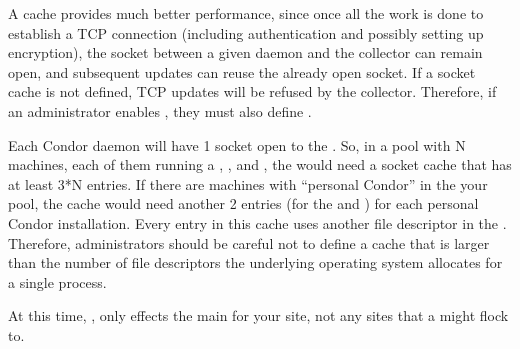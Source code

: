 A cache provides much better performance, since once all the work is
done to establish a TCP connection (including authentication and
possibly setting up encryption), the socket between a given daemon and
the collector can remain open, and subsequent updates can reuse the
already open socket.
If a socket cache is not defined, TCP updates will be refused by
the collector.
Therefore, if an administrator enables
, they must also define
.

Each Condor daemon will have 1 socket open to the .
So, in a pool with N machines, each of them running a ,
, and , the  would
need a socket cache that has at least 3*N entries.
If there are machines with ``personal Condor'' in the your pool, the
cache would need another 2 entries (for the  and
) for each personal Condor installation.
Every entry in this cache uses another file descriptor in the
.
Therefore, administrators should be careful not to define a cache that
is larger than the number of file descriptors the underlying operating
system allocates for a single process.

\Note At this time, , only
effects the main  for your site, not any sites that
a  might flock to.

